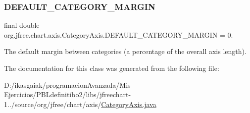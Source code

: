 \subsubsection{\texorpdfstring{D\+E\+F\+A\+U\+L\+T\+\_\+\+C\+A\+T\+E\+G\+O\+R\+Y\+\_\+\+M\+A\+R\+G\+IN}{DEFAULT\_CATEGORY\_MARGIN}}
{\footnotesize\ttfamily final double org.\+jfree.\+chart.\+axis.\+Category\+Axis.\+D\+E\+F\+A\+U\+L\+T\+\_\+\+C\+A\+T\+E\+G\+O\+R\+Y\+\_\+\+M\+A\+R\+G\+IN = 0.\hspace{0.3cm}{\ttfamily [static]}}

The default margin between categories (a percentage of the overall axis length). 

The documentation for this class was generated from the following file\+:\begin{DoxyCompactItemize}
\item 
D\+:/ikasgaiak/programacion\+Avanzada/\+Mis Ejercicios/\+P\+B\+Ldefinitibo2/libs/jfreechart-\/1../source/org/jfree/chart/axis/\mbox{\hyperlink{_category_axis_8java}{Category\+Axis.\+java}}\end{DoxyCompactItemize}
